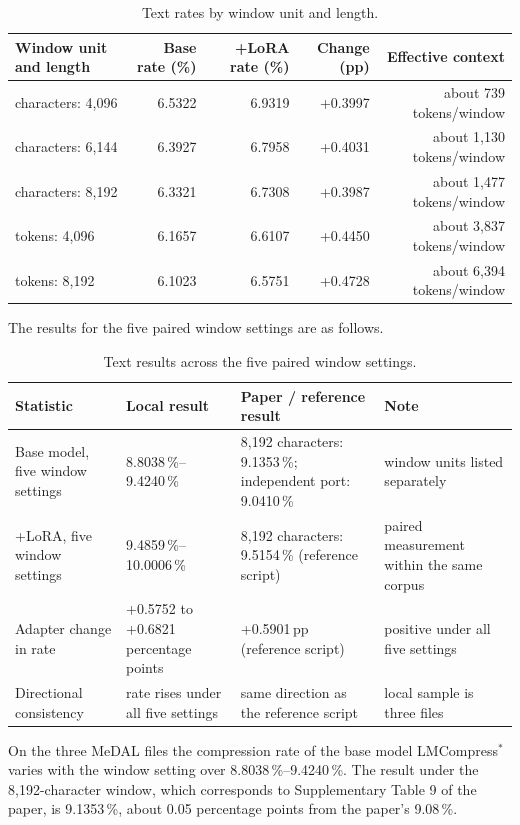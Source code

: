 \documentclass[12pt,a4paper]{article}
\begin{document}
\begin{table}[htbp]\centering\small
\caption{Text rates by window unit and length.}
\begin{tabular}{@{}lrrrr@{}}
\toprule
Window unit and length & Base rate (\%) & +LoRA rate (\%) & Change (pp) & Effective context \\
\midrule
characters: 4{,}096 & 6.5322 & 6.9319 & +0.3997 & about 739 tokens/window \\
characters: 6{,}144 & 6.3927 & 6.7958 & +0.4031 & about 1{,}130 tokens/window \\
characters: 8{,}192 & 6.3321 & 6.7308 & +0.3987 & about 1{,}477 tokens/window \\
tokens: 4{,}096 & 6.1657 & 6.6107 & +0.4450 & about 3{,}837 tokens/window \\
tokens: 8{,}192 & 6.1023 & 6.5751 & +0.4728 & about 6{,}394 tokens/window \\
\bottomrule
\end{tabular}
\end{table}

The results for the five paired window settings are as follows.

\begin{table}[htbp]\centering\small
\caption{Text results across the five paired window settings.}
\begin{tabular}{@{}p{4.2cm}p{3.2cm}p{3.4cm}p{2.8cm}@{}}
\toprule
Statistic & Local result & Paper / reference result & Note \\
\midrule
Base model, five window settings & 8.8038\,\%--9.4240\,\% & 8{,}192 characters: 9.1353\,\%; independent port: 9.0410\,\% & window units listed separately \\
+LoRA, five window settings & 9.4859\,\%--10.0006\,\% & 8{,}192 characters: 9.5154\,\% (reference script) & paired measurement within the same corpus \\
Adapter change in rate & +0.5752 to +0.6821 percentage points & +0.5901\,pp (reference script) & positive under all five settings \\
Directional consistency & rate rises under all five settings & same direction as the reference script & local sample is three files \\
\bottomrule
\end{tabular}
\end{table}

On the three MeDAL files the compression rate of the base model LMCompress$^{*}$ varies with
the window setting over 8.8038\,\%--9.4240\,\%. The result under the 8{,}192-character
window, which corresponds to Supplementary Table 9 of the paper, is 9.1353\,\%, about
0.05 percentage points from the paper's 9.08\,\%.
\end{document}
